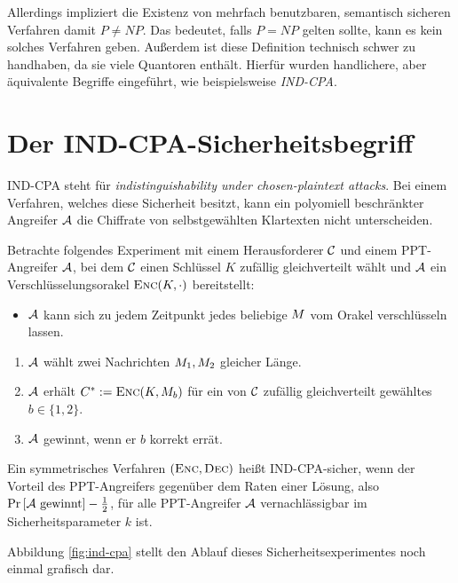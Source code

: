 Allerdings impliziert die Existenz von mehrfach benutzbaren, semantisch sicheren Verfahren damit $P \neq NP$. Das bedeutet, falls $P = NP$ gelten sollte, kann
es kein solches Verfahren geben. Außerdem ist diese Definition technisch schwer zu handhaben, da sie viele Quantoren enthält. Hierfür wurden handlichere, aber äquivalente Begriffe eingeführt, wie beispielsweise \emph{IND-CPA}.

\section{Der IND-CPA-Sicherheitsbegriff}\label{def:ind-cpa}
IND-CPA steht für \emph{indistinguishability under chosen-plaintext
  attacks}. Bei einem Verfahren, welches diese Sicherheit besitzt, kann
ein polyomiell beschränkter Angreifer $\mathcal{A}$ die Chiffrate von
selbstgewählten Klartexten nicht unterscheiden.
\begin{definition}
	Betrachte folgendes Experiment mit einem Herausforderer $\mathcal{C}$ und einem PPT-Angreifer $\mathcal{A}$, bei dem $\mathcal{C}$ einen Schlüssel $K$ zufällig gleichverteilt wählt und $\mathcal{A}$ ein Verschlüsselungsorakel $\textsc{Enc}(K,\cdot)$ bereitstellt: 
	\begin{itemize}
		\item $\mathcal{A}$ kann sich zu jedem Zeitpunkt jedes beliebige
                  $M$ vom Orakel verschlüsseln lassen. 
	\end{itemize}
	\begin{enumerate}
		\item $\mathcal{A}$ wählt zwei Nachrichten $M_1, M_2$ gleicher Länge. 
		\item $\mathcal{A}$ erhält $C^{*} := \textsc{Enc}(K,
                  M_{b})$ für ein von $\mathcal{C}$ zufällig gleichverteilt
                  gewähltes $b \in \{1, 2\}$. 
		\item $\mathcal{A}$ gewinnt, wenn er $b$ korrekt errät.
	\end{enumerate}
	Ein symmetrisches Verfahren $(\textsc{Enc}, \textsc{Dec})$ heißt IND-CPA-sicher, wenn der Vorteil des
        PPT-Angreifers gegenüber dem Raten einer Lösung, also $\Pr
        \left[ \mathcal{A} \textnormal{ gewinnt} \right] - \frac{1}{2}$, für alle
        PPT-Angreifer $\mathcal{A}$ vernachlässigbar im Sicherheitsparameter $k$  ist. 
\end{definition}
Abbildung \ref{fig:ind-cpa} stellt den Ablauf dieses
Sicherheitsexperimentes noch einmal grafisch dar.

